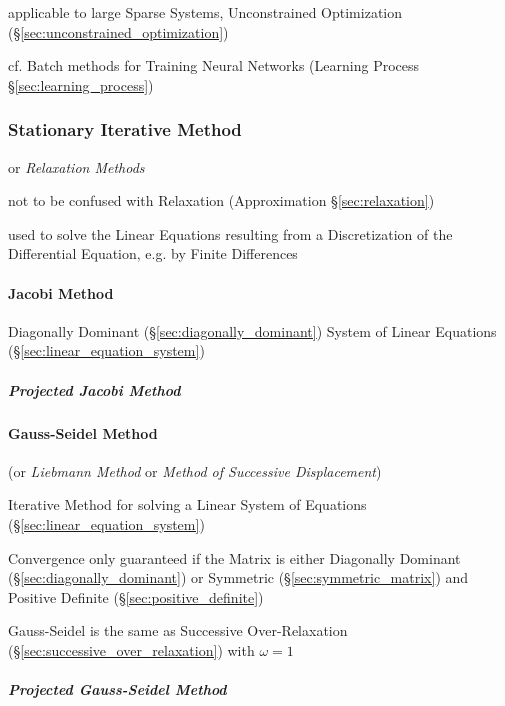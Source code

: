 applicable to large Sparse Systems, Unconstrained Optimization
(\S\ref{sec:unconstrained_optimization})

\fist cf. Batch methods for Training Neural Networks (Learning Process
\S\ref{sec:learning_process})



\subsubsection{Stationary Iterative Method}
\label{sec:stationary_iterative}

or \emph{Relaxation Methods}

\fist not to be confused with Relaxation (Approximation \S\ref{sec:relaxation})

used to solve the Linear Equations resulting from a Discretization of the
Differential Equation, e.g. by Finite Differences



\paragraph{Jacobi Method}\label{sec:jacobi_method}\hfill

Diagonally Dominant (\S\ref{sec:diagonally_dominant}) System of Linear
Equations (\S\ref{sec:linear_equation_system})



\subparagraph{Projected Jacobi Method}
\label{sec:projected_jacobi_method}



\paragraph{Gauss-Seidel Method}\label{sec:gauss_seidel}\hfill

(or \emph{Liebmann Method} or \emph{Method of Successive
  Displacement})

Iterative Method for solving a Linear System of Equations
(\S\ref{sec:linear_equation_system})

Convergence only guaranteed if the Matrix is either Diagonally
Dominant (\S\ref{sec:diagonally_dominant}) or Symmetric
(\S\ref{sec:symmetric_matrix}) and Positive Definite
(\S\ref{sec:positive_definite})

Gauss-Seidel is the same as Successive Over-Relaxation
(\S\ref{sec:successive_over_relaxation}) with $\omega = 1$



\subparagraph{Projected Gauss-Seidel Method}\hfill
\label{sec:projected_gauss_seidel}

